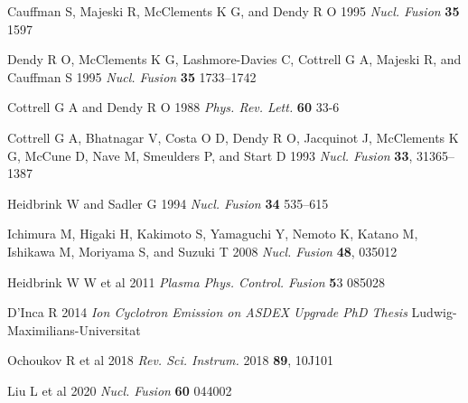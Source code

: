 \documentclass[12pt]{iopart}
\begin{document}
\begin{thebibliography}{9}

Cauffman S, Majeski R, McClements K G, and Dendy R O 1995 \textit{Nucl. Fusion} \textbf{35} 1597

Dendy R O, McClements K G, Lashmore-Davies C, Cottrell G A, Majeski R, and Cauffman S 1995 \textit{Nucl. Fusion} \textbf{35} 1733–1742

Cottrell G A and Dendy R O 1988 \textit{Phys. Rev. Lett.} \textbf{60} 33-6

Cottrell G A, Bhatnagar V, Costa O D, Dendy R O, Jacquinot J, McClements K G, McCune D, Nave M, Smeulders P, and Start D 1993 \textit{Nucl. Fusion} \textbf{33}, 31365–1387
% 

Heidbrink W and Sadler G 1994 \textit{Nucl. Fusion} \textbf{34} 535–615

Ichimura M, Higaki H, Kakimoto S, Yamaguchi Y, Nemoto K, Katano M, Ishikawa M, Moriyama S, and Suzuki T 2008 \textit{Nucl. Fusion} \textbf{48}, 035012

Heidbrink W W et al 2011 \textit{Plasma Phys. Control. Fusion} {\textbf 53} 085028

D’Inca R 2014 \textit{Ion Cyclotron Emission on ASDEX Upgrade PhD Thesis} Ludwig-Maximilians-Universitat

Ochoukov R et al 2018 \textit{Rev. Sci. Instrum.} 2018 \textbf{89}, 10J101

Liu L et al 2020  \textit{Nucl. Fusion} \textbf{60} 044002


\end{thebibliography}
\end{document}
